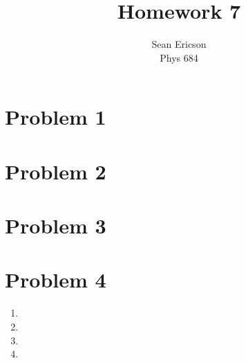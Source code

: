 \documentclass[12pt]{article}
\begin{document}
	
\title{Homework 7}
\author{Sean Ericson \\ Phys 684}
\maketitle

\section*{Problem 1}



\section*{Problem 2}



\section*{Problem 3}



\section*{Problem 4}
\begin{enumerate}[label=(\alph*)]
	\item
	\item
	\item
	\item
\end{enumerate}

%
\end{document}

